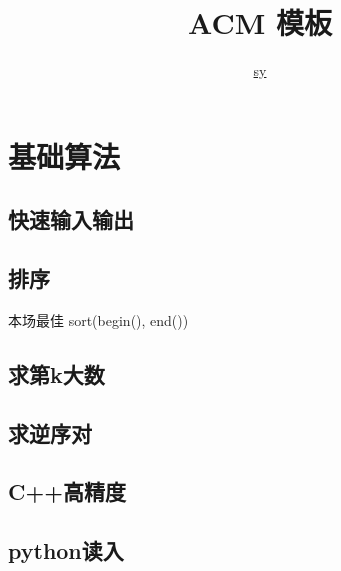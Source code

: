 \documentclass{probook}
\title{ACM 模板}
\author{\href{https://github.com/clumsy-sy?tab=repositories}{sy}}
\begin{document}
\newcommand\mfrac[2]{\dfrac{#1\smash[b]{\strut}}{#2\smash[t]{\strut}}}
\newcommand\ee{\mathrm{e}}
\newcommand\dd{\mathrm{d}}
\newcommand\uppi{\mathrm{\pi}}

\newcommand{\lcm}{\operatorname{lcm}}
\newcommand{\DFT}{\operatorname{DFT}_{\omega_n}}
\newcommand{\Id}{\operatorname{Id}}

\maketitle

\frontmatter

\columnseprule=2pt
\setlength{\columnsep}{30pt}

\tableofcontents
\setlength{\parindent}{0pt}
\mainmatter


\chapter{基础算法} 
\section{快速输入输出} 

\section{排序}
本场最佳 sort(begin(), end())

\section{求第k大数}

\section{求逆序对}

\section{C++高精度}

\section{python读入}

\end{document}
